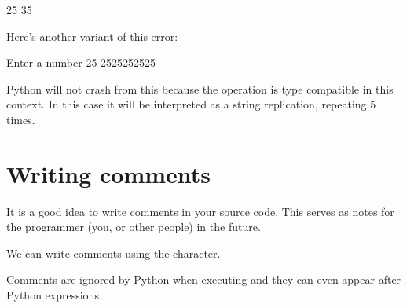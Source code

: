 \documentclass[letterpaper,10pt,english]{jupyterBook}
\begin{document}
\begin{sphinxVerbatim}[commandchars=\\\{\}]
25
35
\end{sphinxVerbatim}

\sphinxAtStartPar
Here’s another variant of this error:

\begin{sphinxVerbatim}[commandchars=\\\{\}]
  
  
\end{sphinxVerbatim}

\begin{sphinxVerbatim}[commandchars=\\\{\}]
Enter a number
25
2525252525
\end{sphinxVerbatim}

\sphinxAtStartPar
Python will not crash from this because the \sphinxcode{\sphinxupquote{*}} operation is type compatible in this context. In this case it will be interpreted as a string replication, repeating  5 times.


\section{Writing comments}
\label{\detokenize{first-program:writing-comments}}
\sphinxAtStartPar
It is a good idea to write comments in your source code.
This serves as notes for the programmer (you, or other people) in the future.

\sphinxAtStartPar
We can write comments using the \sphinxcode{\sphinxupquote{\#}} character.

\begin{sphinxVerbatim}[commandchars=\\\{\}]
\end{sphinxVerbatim}

\sphinxAtStartPar
Comments are ignored by Python when executing and they can even appear after Python expressions.

\begin{sphinxVerbatim}[commandchars=\\\{\}]
     
\end{sphinxVerbatim}
\end{document}
